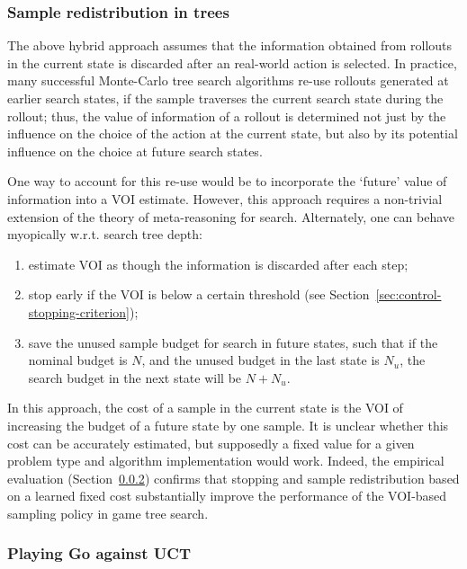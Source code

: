\documentclass[]{article}
\begin{document}
\subsubsection{Sample redistribution in trees}
\label{sec:control-redistribution}

The above hybrid approach assumes
that the information obtained from rollouts in the
current state is discarded after an real-world action is selected. In practice,
many successful Monte-Carlo tree search algorithms re-use rollouts
generated at earlier search states, if the sample traverses the
current search state during the rollout; thus, the value of information of a rollout is
determined not just by the influence on the choice of the action at
the current state, but also by its potential influence on the choice at future
search states.

One way to account for this re-use would be to incorporate the
`future' value of information into a VOI estimate. However, this 
approach requires a non-trivial extension of the theory of meta-reasoning for search.
Alternately, one can behave myopically w.r.t. search tree depth:
\begin{enumerate}
\item estimate VOI as though the information is discarded after each step;
\item stop early if the VOI is below a certain threshold
   (see Section~\ref{sec:control-stopping-criterion});
\item save the unused sample budget for search in future states, such that
   if the nominal budget is $N$, and the unused budget in the last state
   is $N_u$, the search budget in the next state will be $N+N_u$.
\end{enumerate}
In this approach, the cost of a sample in the current state is the
VOI of increasing the budget of a future state by one sample.  It is
unclear whether this cost can be accurately estimated, but supposedly
a fixed value for a given problem type and algorithm implementation
would work. Indeed, the empirical evaluation (Section~\ref{sec:emp-go})
confirms that stopping and sample redistribution based on a learned
fixed cost  substantially improve the performance of the VOI-based
sampling policy in game tree search.


\subsubsection{Playing Go against UCT}
\label{sec:emp-go}
\end{document}
